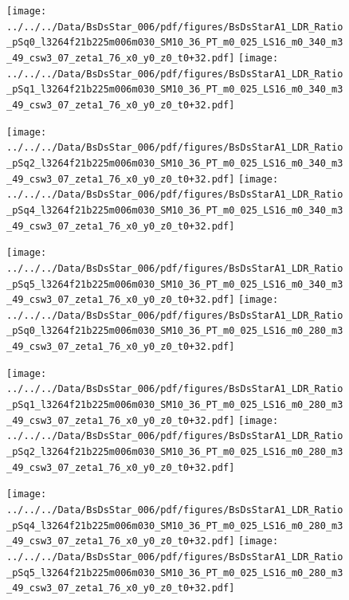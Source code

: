 \documentclass[a4paper,10pt]{article}
\begin{document}
\begin{figure}[p]
 \texttt{[image: ../../../Data/BsDsStar\_006/pdf/figures/BsDsStarA1\_LDR\_Ratio\_pSq0\_l3264f21b225m006m030\_SM10\_36\_PT\_m0\_025\_LS16\_m0\_340\_m3\_49\_csw3\_07\_zeta1\_76\_x0\_y0\_z0\_t0+32.pdf]} 
 \texttt{[image: ../../../Data/BsDsStar\_006/pdf/figures/BsDsStarA1\_LDR\_Ratio\_pSq1\_l3264f21b225m006m030\_SM10\_36\_PT\_m0\_025\_LS16\_m0\_340\_m3\_49\_csw3\_07\_zeta1\_76\_x0\_y0\_z0\_t0+32.pdf]} 
 \end{figure}
\begin{figure}[p]
 \texttt{[image: ../../../Data/BsDsStar\_006/pdf/figures/BsDsStarA1\_LDR\_Ratio\_pSq2\_l3264f21b225m006m030\_SM10\_36\_PT\_m0\_025\_LS16\_m0\_340\_m3\_49\_csw3\_07\_zeta1\_76\_x0\_y0\_z0\_t0+32.pdf]} 
 \texttt{[image: ../../../Data/BsDsStar\_006/pdf/figures/BsDsStarA1\_LDR\_Ratio\_pSq4\_l3264f21b225m006m030\_SM10\_36\_PT\_m0\_025\_LS16\_m0\_340\_m3\_49\_csw3\_07\_zeta1\_76\_x0\_y0\_z0\_t0+32.pdf]} 
 \end{figure}
\begin{figure}[p]
 \texttt{[image: ../../../Data/BsDsStar\_006/pdf/figures/BsDsStarA1\_LDR\_Ratio\_pSq5\_l3264f21b225m006m030\_SM10\_36\_PT\_m0\_025\_LS16\_m0\_340\_m3\_49\_csw3\_07\_zeta1\_76\_x0\_y0\_z0\_t0+32.pdf]} 
 \texttt{[image: ../../../Data/BsDsStar\_006/pdf/figures/BsDsStarA1\_LDR\_Ratio\_pSq0\_l3264f21b225m006m030\_SM10\_36\_PT\_m0\_025\_LS16\_m0\_280\_m3\_49\_csw3\_07\_zeta1\_76\_x0\_y0\_z0\_t0+32.pdf]} 
 \end{figure}
\clearpage
\begin{figure}[p]
 \texttt{[image: ../../../Data/BsDsStar\_006/pdf/figures/BsDsStarA1\_LDR\_Ratio\_pSq1\_l3264f21b225m006m030\_SM10\_36\_PT\_m0\_025\_LS16\_m0\_280\_m3\_49\_csw3\_07\_zeta1\_76\_x0\_y0\_z0\_t0+32.pdf]} 
 \texttt{[image: ../../../Data/BsDsStar\_006/pdf/figures/BsDsStarA1\_LDR\_Ratio\_pSq2\_l3264f21b225m006m030\_SM10\_36\_PT\_m0\_025\_LS16\_m0\_280\_m3\_49\_csw3\_07\_zeta1\_76\_x0\_y0\_z0\_t0+32.pdf]} 
 \end{figure}
\begin{figure}[p]
 \texttt{[image: ../../../Data/BsDsStar\_006/pdf/figures/BsDsStarA1\_LDR\_Ratio\_pSq4\_l3264f21b225m006m030\_SM10\_36\_PT\_m0\_025\_LS16\_m0\_280\_m3\_49\_csw3\_07\_zeta1\_76\_x0\_y0\_z0\_t0+32.pdf]} 
 \texttt{[image: ../../../Data/BsDsStar\_006/pdf/figures/BsDsStarA1\_LDR\_Ratio\_pSq5\_l3264f21b225m006m030\_SM10\_36\_PT\_m0\_025\_LS16\_m0\_280\_m3\_49\_csw3\_07\_zeta1\_76\_x0\_y0\_z0\_t0+32.pdf]} 
 \end{figure}
\clearpage
\end{document}
